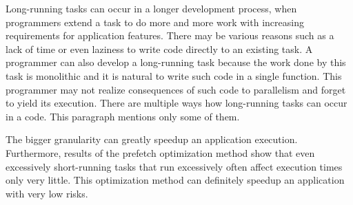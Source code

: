 Long-running tasks can occur in a longer development process, when programmers extend a task to do more and more work with increasing requirements for application features. There may be various reasons such as a lack of time or even laziness to write code directly to an existing task. A programmer can also develop a long-running task because the work done by this task is monolithic and it is natural to write such code in a single function. This programmer may not realize consequences of such code to parallelism and forget to yield its execution. There are multiple ways how long-running tasks can occur in a code. This paragraph mentions only some of them.

The bigger granularity can greatly speedup an application execution. Furthermore, results of the prefetch optimization method show that even excessively short-running tasks that run excessively often affect execution times only very little. This optimization method can definitely speedup an application with very low risks.